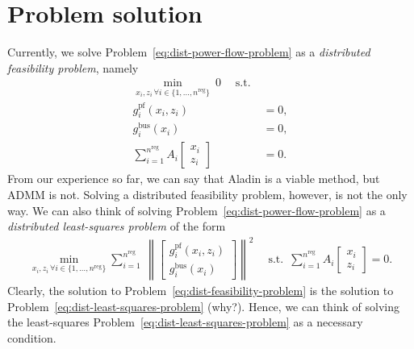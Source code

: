 \documentclass{article}
\newcommand{\n}{n}
\newcommand{\nregions}{\n^{\text{reg}}}
\newcommand{\stateCore}{x}
\newcommand{\stateCopy}{z}
\newcommand{\pf}{g^{\text{pf}}}
\newcommand{\busspecs}{g^{\text{bus}}}
\newcommand{\norm}[1]{\left\lVert#1\right\rVert}
\begin{document}
\section{Problem solution}
Currently, we solve Problem~\ref{eq:dist-power-flow-problem} as a \emph{distributed feasibility problem}, namely
\begin{subequations}
    \label{eq:dist-feasibility-problem}
    \begin{align}
        \underset{\stateCore_i, \stateCopy_i \, \forall i \in  \{1, \dots, \nregions\}}{\operatorname{min}} \: 0 \quad \operatorname{s.t.}\\
        \pf_i( \stateCore_i, \stateCopy_i ) &= 0, \\
        \busspecs_i ( \stateCore_i ) &= 0, \\
        \sum_{i = 1}^{\nregions} A_i \begin{bmatrix}
            \stateCore_i \\
            \stateCopy_i
        \end{bmatrix}
        &= 0.
    \end{align}
\end{subequations}
From our experience so far, we can say that Aladin is a viable method, but ADMM is not.
Solving a distributed feasibility problem, however, is not the only way.
We can also think of solving Problem~\ref{eq:dist-power-flow-problem} as a \emph{distributed least-squares problem} of the form
\begin{subequations}
    \label{eq:dist-least-squares-problem}
    \begin{align}
        \underset{\stateCore_i, \stateCopy_i \, \forall i \in  \{1, \dots, \nregions\}}{\operatorname{min}} \sum_{i = 1}^{\nregions}  \: \norm{\begin{bmatrix}
            \pf_i( \stateCore_i, \stateCopy_i ) \\
            \busspecs_i ( \stateCore_i )
        \end{bmatrix}}^2 \quad \operatorname{s.t.} ~ \sum_{i = 1}^{\nregions} A_i \begin{bmatrix}
            \stateCore_i \\
            \stateCopy_i
        \end{bmatrix}
        = 0.
    \end{align}
\end{subequations}
Clearly, the solution to Problem~\ref{eq:dist-feasibility-problem} is the solution to Problem~\ref{eq:dist-least-squares-problem} (why?).
Hence, we can think of solving the least-squares Problem~\ref{eq:dist-least-squares-problem} as a necessary condition.
\end{document}
